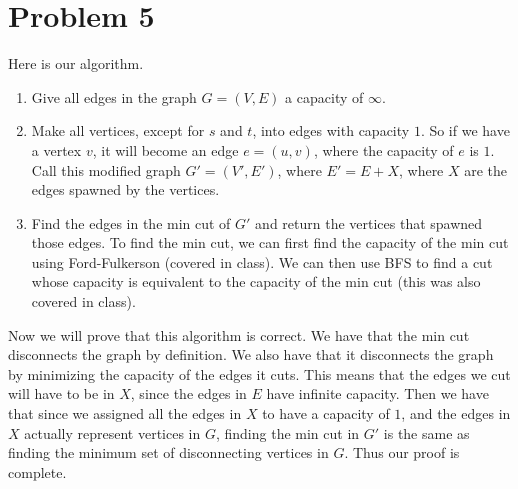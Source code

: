 \documentclass{article}
\begin{document}
\section*{Problem 5}
Here is our algorithm.
\begin{enumerate}
    \item Give all edges in the graph $G = (V, E)$ a capacity of $\infty$.
    \item Make all vertices, except for $s$ and $t$,
            into edges with capacity $1$. So if we have
        a vertex $v$, it will become an edge $e = (u,v)$, where the capacity
        of $e$ is $1$. Call this modified graph $G' = (V', E')$, where
        $E' = E + X$, where $X$ are the edges spawned by the vertices.
    \item Find the edges in the min cut of $G'$ and return the vertices that
        spawned those edges. To find the min cut, we can first find the
        capacity of the min cut using Ford-Fulkerson (covered in class). We
        can then use BFS to find a cut whose capacity is equivalent to the
        capacity of the min cut (this was also covered in class).
\end{enumerate}
Now we will prove that this algorithm is correct. We have that the min cut
disconnects the graph by definition. We also have that it disconnects the
graph by minimizing the capacity of the edges it cuts. This means that
the edges we cut will have to be in $X$, since the edges in $E$ have infinite
capacity. Then we have that since we assigned all the edges in $X$ to have
a capacity of $1$, and the edges in $X$ actually represent vertices in $G$,
finding the min cut in $G'$ is the same as finding the minimum set of
disconnecting vertices in $G$. Thus our proof is complete.
\end{document}
